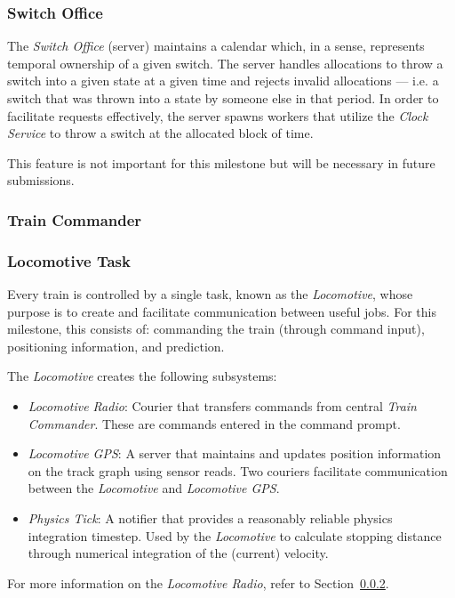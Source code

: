 \documentclass[twoside,a4paper]{refart}
\begin{document}
\subsubsection{Switch Office}
The \textit{Switch Office} (server) maintains a calendar which, in a sense, represents temporal ownership of a given switch. The server handles allocations to throw a switch into a given state at a given time and rejects invalid allocations --- i.e. a switch that was thrown into a state by someone else in that period. In order to facilitate requests effectively, the server spawns workers that utilize the \textit{Clock Service} to throw a switch at the allocated block of time.

This feature is not important for this milestone but will be necessary in future submissions.

\subsubsection{Train Commander}
\label{sec:traincommander}


\subsubsection{Locomotive Task}
Every train is controlled by a single task, known as the \textit{Locomotive}, whose purpose is to create and facilitate communication between useful jobs. For this milestone, this consists of: commanding the train (through command input), positioning information, and prediction.

The \textit{Locomotive} creates the following subsystems:
\begin{itemize}
    \item{ \textit{Locomotive Radio}: Courier that transfers commands from central \textit{Train Commander}. These are commands entered in the command prompt.}
    \item{ \textit{Locomotive GPS}: A server that maintains and updates position information on the track graph using sensor reads. Two couriers facilitate communication between the \textit{Locomotive} and \textit{Locomotive GPS}. }
    \item{ \textit{Physics Tick}: A notifier that provides a reasonably reliable physics integration timestep. Used by the \textit{Locomotive} to calculate stopping distance through numerical integration of the (current) velocity. }
\end{itemize}
For more information on the \textit{Locomotive Radio}, refer to Section~\ref{sec:traincommander}.
\end{document}
